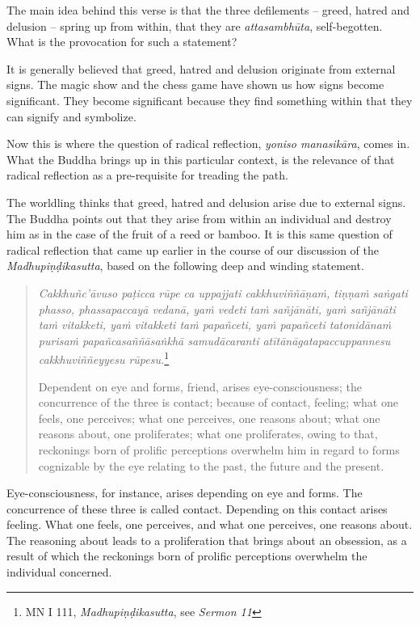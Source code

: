 The main idea behind this verse is that the three defilements -- greed, hatred and delusion -- spring up from within, that they are \emph{attasambhūta}, self-begotten. What is the provocation for such a statement?

It is generally believed that greed, hatred and delusion originate from external signs. The magic show and the chess game have shown us how signs become significant. They become significant because they find something within that they can signify and symbolize.

Now this is where the question of radical reflection, \emph{yoniso manasikāra}, comes in. What the Buddha brings up in this particular context, is the relevance of that radical reflection as a pre-requisite for treading the path.

The worldling thinks that greed, hatred and delusion arise due to external signs. The Buddha points out that they arise from within an individual and destroy him as in the case of the fruit of a reed or bamboo. It is this same question of radical reflection that came up earlier in the course of our discussion of the \emph{Madhupiṇḍikasutta}, based on the following deep and winding statement.

\begin{quote}
\emph{Cakkhuñc'āvuso paṭicca rūpe ca uppajjati cakkhuviññāṇaṁ, tiṇṇaṁ saṅgati phasso, phassapaccayā vedanā, yaṁ vedeti taṁ sañjānāti, yaṁ sañjānāti taṁ vitakketi, yaṁ vitakketi taṁ papañceti, yaṁ papañceti tatonidānaṁ purisaṁ papañcasaññāsaṅkhā samudācaranti atītānāgatapaccuppannesu cakkhuviññeyyesu rūpesu.}\footnote{MN I 111, \emph{Madhupiṇḍikasutta}, see \emph{Sermon 11}}

Dependent on eye and forms, friend, arises eye-consciousness; the concurrence of the three is contact; because of contact, feeling; what one feels, one perceives; what one perceives, one reasons about; what one reasons about, one proliferates; what one proliferates, owing to that, reckonings born of prolific perceptions overwhelm him in regard to forms cognizable by the eye relating to the past, the future and the present.
\end{quote}

Eye-consciousness, for instance, arises depending on eye and forms. The concurrence of these three is called contact. Depending on this contact arises feeling. What one feels, one perceives, and what one perceives, one reasons about. The reasoning about leads to a proliferation that brings about an obsession, as a result of which the reckonings born of prolific perceptions overwhelm the individual concerned.

